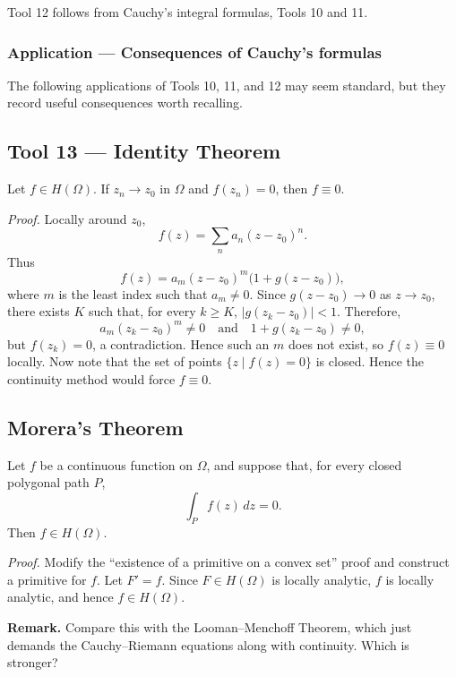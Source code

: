 \documentclass[11pt,a4paper]{article}
\begin{document}
Tool 12 follows from Cauchy's integral formulas, Tools 10 and 11.
\subsubsection*{Application — Consequences of Cauchy's formulas}
The following applications of Tools 10, 11, and 12 may seem
standard, but they record useful consequences worth
recalling.


\subsection*{Tool 13 — Identity Theorem}

Let $f\in H(\Omega)$. If $z_n\to z_0$ in $\Omega$ and $f(z_n)=0$, then
$f\equiv0$.


\textit{Proof.}
Locally around $z_0$,
\[
  f(z)=\sum_n a_n(z-z_0)^n.
\]
Thus
\[
  f(z)=a_m(z-z_0)^m\bigl(1+g(z-z_0)\bigr),
\]
where $m$ is the least index such that $a_m\neq0$. Since
$g(z-z_0)\to0$ as $z\to z_0$, there exists $K$ such that, for every $k\geq K$, \(|g(z_k-z_0)|<1.\)
Therefore,
\[
  a_m(z_k-z_0)^m\neq0
  \quad\text{and}\quad
  1+g(z_k-z_0)\neq0,
\]
but $f(z_k)=0$, a contradiction. Hence such an $m$ does not exist, so
$f(z)\equiv0$ locally. Now note that the set of points
$\{z\mid f(z)=0\}$ is closed. Hence the continuity method would force
$f\equiv0$.

\subsection*{Morera's Theorem}
Let $f$ be a continuous function on $\Omega$, and suppose that, for every
closed polygonal path $P$,
\[
  \int_P f(z)\,dz=0.
\]
Then $f\in H(\Omega)$.

\textit{Proof.}
Modify the ``existence of a primitive on a convex set'' proof and construct a
primitive for $f$. Let $F'=f$. Since $F\in H(\Omega)$ is locally analytic,
$f$ is locally analytic, and hence $f\in H(\Omega)$.

\textbf{Remark.}
Compare this with the Looman--Menchoff Theorem, which just demands the
Cauchy--Riemann equations along with continuity. Which is stronger?
\end{document}
